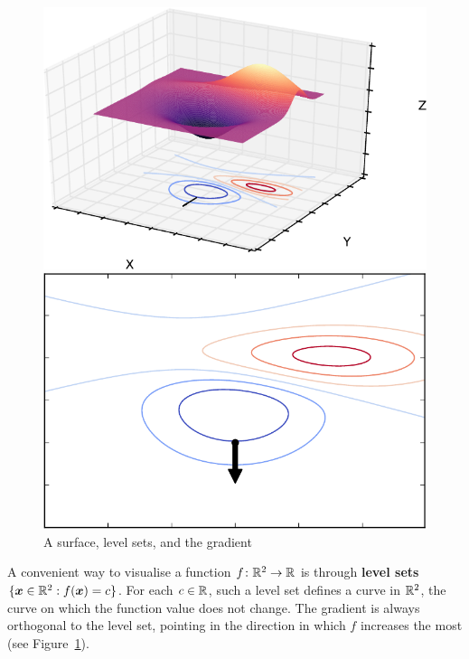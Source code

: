 \begin{figure}[ht!]
\centering
\begin{minipage}{0.45\textwidth}
\includegraphics[width=\textwidth]{images/3dsurf.pdf}
\end{minipage}
\begin{minipage}{0.45\textwidth}
\includegraphics[scale=0.4]{images/contour.pdf}
\end{minipage}
\caption{A surface, level sets, and the gradient}\label{fig:level}
\end{figure}

A convenient way to visualise a function $f\colon \mathbb{R}^2\to \mathbb{R}$ is through \textbf{level sets} $\{\bm{x}\in \mathbb{R}^2 \mathrel{\mathop{:}} f(\bm{x})=c\}$. For each $c\in \mathbb{R}$, such a level set defines a curve in $\mathbb{R}^2$, the curve on which the function value does not change. The gradient is always orthogonal to the level set, pointing in the direction in which $f$ increases the most (see Figure~\ref{fig:level}).

